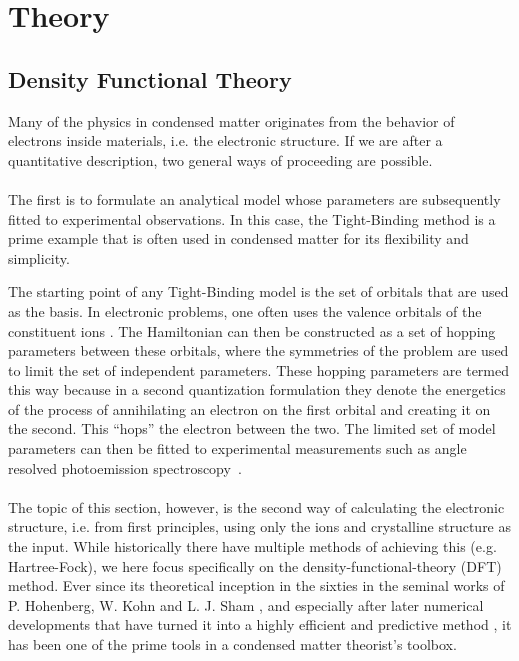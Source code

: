 \chapter{Theory}

\section{Density Functional Theory \label{sec:DFT}}
Many of the physics in condensed matter originates from the behavior of electrons inside materials, i.e. the electronic structure.
If we are after a quantitative description, two general ways of proceeding are possible. 
\\\\
The first is to formulate an analytical model whose parameters are subsequently fitted to experimental observations. 
In this case, the Tight-Binding method is a prime example that is often used in condensed matter for its flexibility and simplicity.

The starting point of any Tight-Binding model is the set of orbitals that are used as the basis.
In electronic problems, one often uses the valence orbitals of the constituent ions \cite{Bloch1929,Slater1954}.
The Hamiltonian can then be constructed as a set of hopping parameters between these orbitals, where the symmetries of the problem are used to limit the set of independent parameters.
These hopping parameters are termed this way because in a second quantization formulation they denote the energetics of the process of annihilating an electron on the first orbital and creating it on the second.
This ``hops'' the electron between the two.
The limited set of model parameters can then be fitted to experimental measurements such as angle resolved photoemission spectroscopy~\cite{Damascelli2004}.
\\\\
The topic of this section, however, is the second way of calculating the electronic structure, i.e. from first principles, using only the ions and crystalline structure as the input. 
While historically there have multiple methods of achieving this (e.g. Hartree-Fock), we here focus specifically on the density-functional-theory (DFT) method.
Ever since its theoretical inception in the sixties in the seminal works of P. Hohenberg, W. Kohn and L. J. Sham  \cite{Hohenberg1964,Kohn1965}, and especially after later numerical developments that have turned it into a highly efficient and predictive method \cite{Hamann1979,Louie1982,Vanderbilt1990,Joubert1999,Perdew1985,Perdew1986,Perdew1993}, it has been one of the prime tools in a condensed matter theorist's toolbox.


